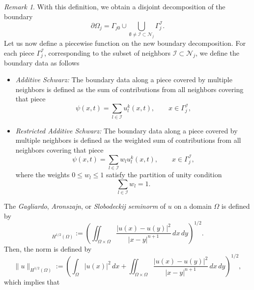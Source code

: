 \documentclass[a4paper, 11pt]{article}
\theoremstyle{remark}
\newtheorem{remark}[equation]{Remark}
\begin{document}
\begin{remark}
    \noindent With this definition, we obtain a disjoint decomposition of the boundary
    \begin{equation*}
        \partial\Omega_{j} = \Gamma_{j0}\cup\bigcup_{\emptyset \neq \mathcal{I}\subset\mathcal{N}_{j}}\Gamma_{j}^{\mathcal{I}}.
    \end{equation*}
    Let us now define a piecewise function on the new boundary decomposition. For each piece $\Gamma_{j}^{\mathcal{I}}$, corresponding to the subset of neighbors $\mathcal{I}\subset\mathcal{N}_{j}$, we define the boundary data as follows
    \begin{itemize}
        \item [--] \textit{Additive Schwarz:} The boundary data along a piece covered by multiple neighbors is defined as the sum of contributions from all neighbors covering that piece
        \begin{equation*}
            \psi(x, t) = \sum_{l\in\mathcal{I}}u_{l}^{k}(x, t),\qquad x\in \Gamma_{j}^{\mathcal{I}}, 
        \end{equation*}
        \item [--] \textit{Restricted Additive Schwarz:} The boundary data along a piece covered by multiple neighbors is defined as the weighted sum of contributions from all neighbors covering that piece
        \begin{equation*}
            \psi(x, t) = \sum_{l\in\mathcal{I}}w_{l}u_{l}^{k}(x, t),\qquad x\in \Gamma_{j}^{\mathcal{I}}, 
        \end{equation*}
        where the weights $0\leq w_{l} \leq 1$ satisfy the partition of unity condition
        \begin{equation*}
            \sum_{l\in \mathcal{I}}w_{l} = 1.
        \end{equation*}
    \end{itemize}
    The \textit{Gagliardo}, \textit{Aronszajn}, or \textit{Slobodeckij seminorm} of $u$ on a domain $\Omega$ is defined by
    \begin{equation*}
        [u]_{H^{1/2}(\Omega)} := \left(\iint_{\Omega\times\Omega}\dfrac{|u(x) - u(y)|^{2}}{|x-y|^{n+1}} \, dx\,dy\right)^{1/2}.
    \end{equation*}
    Then, the norm is defined by
    \begin{equation*}
        \lVert u\rVert_{H^{1/2}(\Omega)} := \left(\int_{\Omega}|u(x)|^{2}\,dx + \iint_{\Omega\times\Omega}\dfrac{|u(x) - u(y)|^{2}}{|x-y|^{n+1}} \, dx\,dy\right)^{1/2},
    \end{equation*}
    which implies that

\end{remark}
\end{document}
